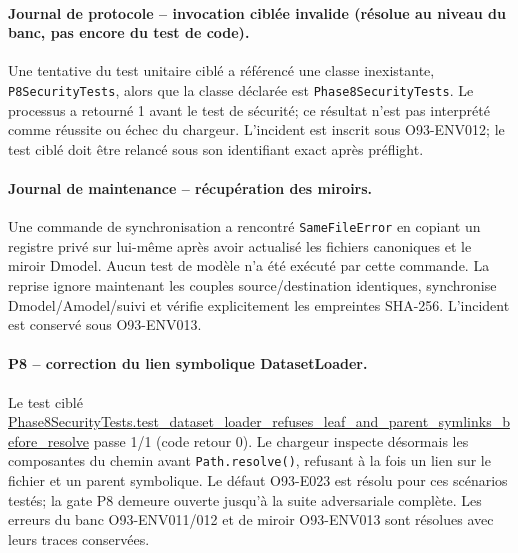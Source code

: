 \documentclass[11pt,a4paper,oneside]{report}
\begin{document}
\paragraph{Journal de protocole -- invocation ciblée invalide (résolue au niveau du banc, pas encore du test de code).}
Une tentative du test unitaire ciblé a référencé une classe inexistante, \texttt{P8SecurityTests}, alors que la classe déclarée est \texttt{Phase8SecurityTests}. Le processus a retourné 1 avant le test de sécurité; ce résultat n'est pas interprété comme réussite ou échec du chargeur. L'incident est inscrit sous O93-ENV012; le test ciblé doit être relancé sous son identifiant exact après préflight.


\paragraph{Journal de maintenance -- récupération des miroirs.}
Une commande de synchronisation a rencontré \texttt{SameFileError} en copiant un registre privé sur lui-même après avoir actualisé les fichiers canoniques et le miroir Dmodel. Aucun test de modèle n'a été exécuté par cette commande. La reprise ignore maintenant les couples source/destination identiques, synchronise Dmodel/Amodel/suivi et vérifie explicitement les empreintes SHA-256. L'incident est conservé sous O93-ENV013.


\paragraph{P8 -- correction du lien symbolique DatasetLoader.}
Le test ciblé \url{Phase8SecurityTests.test_dataset_loader_refuses_leaf_and_parent_symlinks_before_resolve} passe 1/1 (code retour 0). Le chargeur inspecte désormais les composantes du chemin avant \texttt{Path.resolve()}, refusant à la fois un lien sur le fichier et un parent symbolique. Le défaut O93-E023 est résolu pour ces scénarios testés; la gate P8 demeure ouverte jusqu'à la suite adversariale complète. Les erreurs du banc O93-ENV011/012 et de miroir O93-ENV013 sont résolues avec leurs traces conservées.
\end{document}
